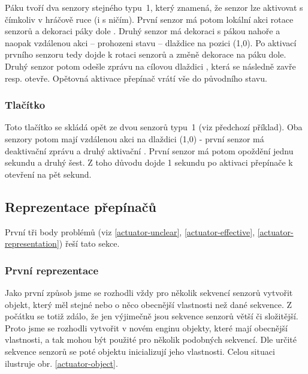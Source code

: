 Páku tvoří dva senzory stejného typu~1, který znamená, že senzor lze aktivovat s čímkoliv v hráčově ruce (i s ničím).
První senzor má potom lokální akci rotace senzorů a dekoraci páky dole . Druhý senzor má dekoraci s pákou 
nahoře a naopak vzdálenou akci -- prohozeni stavu -- dlaždice  na pozici (1,0). Po aktivací prvního senzoru
tedy dojde k rotaci senzorů a změně dekorace na páku dole. Druhý senzor potom odešle zprávu na cílovou dlaždici ,
která se následně zavře resp. otevře. Opětovná aktivace přepínač vrátí vše do původního stavu.



\subsubsection{Tlačítko}

Toto tlačítko se skládá opět ze dvou senzorů typu~1 (viz předchozí příklad). Oba senzory potom mají 
vzdálenou akci na dlaždici (1,0) - první senzor má deaktivační zprávu a druhý aktivační .
První senzor má potom opoždění jednu sekundu a druhý šest. Z toho důvodu dojde 1 sekundu po aktivaci přepínače k otevření
 na pět sekund.





\subsection{Reprezentace přepínačů}
První tři body problémů  (viz \ref{actuator-unclear}, \ref{actuator-effective}, \ref{actuator-representation}) řeší tato sekce.

\subsubsection{První reprezentace}\label{rep-v1}

Jako první způsob jsme se rozhodli vždy pro několik sekvencí senzorů vytvořit objekt, který měl stejné nebo o něco obecnější vlastnosti než dané sekvence.
Z počátku se totiž zdálo, že jen výjimečně jsou sekvence senzorů větší či složitější. Proto jsme se rozhodli vytvořit v
novém enginu objekty, které mají obecnější vlastnosti, a tak mohou být použité pro několik podobných sekvencí. Dle určité sekvence senzorů se poté
objektu inicializují jeho vlastnosti. Celou situaci ilustruje obr. \ref{actuator-object}.

